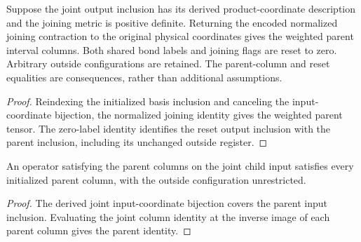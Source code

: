 \begin{lemma}
    \label{thm:mpu_encoded_actual_parent_columns}
    \leanok
    Suppose the joint output inclusion has its derived product-coordinate
    description and the joining metric is positive definite. Returning the encoded
    normalized joining contraction to the original physical coordinates gives
    the weighted parent interval columns. Both shared bond labels and
    joining flags are reset to zero. Arbitrary outside configurations are retained.
    The parent-column and reset equalities are consequences, rather than additional
    assumptions.
\end{lemma}
\begin{proof}\leanok
    Reindexing the initialized basis inclusion and canceling the input-coordinate
    bijection, the normalized joining identity gives the weighted parent tensor.
    The zero-label identity identifies the reset output inclusion with
    the parent inclusion, including its unchanged outside register.
\end{proof}

\begin{lemma}
    \label{thm:mpu_parent_invariant_from_joint_columns}
    \leanok
    An operator satisfying the parent columns on the joint child input
    satisfies every initialized parent column, with the outside configuration
    unrestricted.
\end{lemma}
\begin{proof}\leanok
    The derived joint input-coordinate bijection covers the parent input inclusion.
    Evaluating the joint column identity at the inverse image of each parent column gives the parent identity.
\end{proof}

